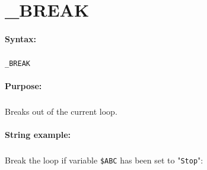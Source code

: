 
\newpage
\section{\_BREAK}
\label{cmd:_BREAK}

\paragraph{Syntax:}
\subparagraph{}
\texttt{\_BREAK}

\paragraph{Purpose:}
\subparagraph{}
Breaks out of the current loop.

\paragraph{String example:}
\subparagraph{}
Break the loop if variable \texttt{\$ABC} has been
set to "\texttt{Stop}":

